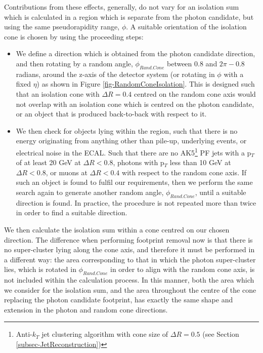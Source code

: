 Contributions from these effects, generally, do not vary for an isolation sum which is calculated in a region which is separate from the photon candidate, but using the same pseudorapidity range, $\phi$. A suitable orientation of the isolation cone is chosen by using the proceeding steps:

\begin{itemize}
	\item We define a direction which is obtained from the photon candidate direction, and then rotating by a random angle, $\phi_{Rand.Cone}$ between $0.8$ and $2\pi - 0.8$ radians, around the z-axis of the detector system (or rotating in $\phi$ with a fixed $\eta$) as shown in Figure \ref{fig-RandomConeIsolation}. This is designed such that an isolation cone with $\Delta R = 0.4$ centred on the random cone axis would not overlap with an isolation cone which is centred on the photon candidate, or an object that is produced back-to-back with respect to it.
	\item We then check for objects lying within the region, such that there is no energy originating from anything other than pile-up, underlying events, or electrical noise in the ECAL. Such that there are no AK5\footnote{Anti-$k_T$ jet clustering algorithm with cone size of $\Delta R = 0.5$ (see Section \ref{subsec-JetReconstruction})} PF jets with a p$_T$ of at least 20 GeV at $\Delta R < 0.8$, photons with p$_T$ less than 10 GeV at $\Delta R < 0.8$, or muons at $\Delta R < 0.4$ with respect to the random cone axis. If such an object is found to fulfil our requirements, then we perform the same search again to generate another random angle, $\phi_{Rand.Cone}$, until a suitable direction is found. In practice, the procedure is not repeated more than twice in order to find a suitable direction.   
\end{itemize}

We then calculate the isolation sum within a cone centred on our chosen direction. The difference when performing footprint removal now is that there is no super-cluster lying along the cone axis, and therefore it must be performed in a different way: the area corresponding to that in which the photon super-cluster lies, which is rotated in $\phi_{Rand.Cone}$ in order to align with the random cone axis, is not included within the calculation process. In this manner, both the area which we consider for the isolation sum, and the area throughout the centre of the cone replacing the photon candidate footprint, has exactly the same shape and extension in the photon and random cone directions.   

